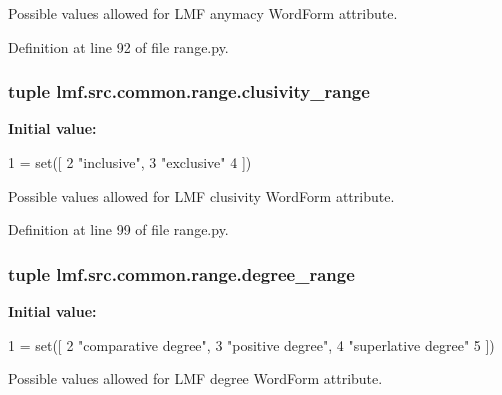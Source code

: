 Possible values allowed for L\+M\+F anymacy Word\+Form attribute. 



Definition at line 92 of file range.\+py.

\hypertarget{namespacelmf_1_1src_1_1common_1_1range_aa39563f49d7d421ce4b55d2385f3a7f7}{
\subsubsection[{clusivity\+\_\+range}]{\setlength{\rightskip}{0pt plus 5cm}tuple lmf.\+src.\+common.\+range.\+clusivity\+\_\+range}}\label{namespacelmf_1_1src_1_1common_1_1range_aa39563f49d7d421ce4b55d2385f3a7f7}
{\bfseries Initial value\+:}
\begin{DoxyCode}
1 = set([
2     \textcolor{stringliteral}{"inclusive"},
3     \textcolor{stringliteral}{"exclusive"}
4 ])
\end{DoxyCode}


Possible values allowed for L\+M\+F clusivity Word\+Form attribute. 



Definition at line 99 of file range.\+py.

\hypertarget{namespacelmf_1_1src_1_1common_1_1range_a38a6c009293e81b8b03b7072692f7a3c}{
\subsubsection[{degree\+\_\+range}]{\setlength{\rightskip}{0pt plus 5cm}tuple lmf.\+src.\+common.\+range.\+degree\+\_\+range}}\label{namespacelmf_1_1src_1_1common_1_1range_a38a6c009293e81b8b03b7072692f7a3c}
{\bfseries Initial value\+:}
\begin{DoxyCode}
1 = set([
2     \textcolor{stringliteral}{"comparative degree"},
3     \textcolor{stringliteral}{"positive degree"},
4     \textcolor{stringliteral}{"superlative degree"}
5 ])
\end{DoxyCode}


Possible values allowed for L\+M\+F degree Word\+Form attribute. 




